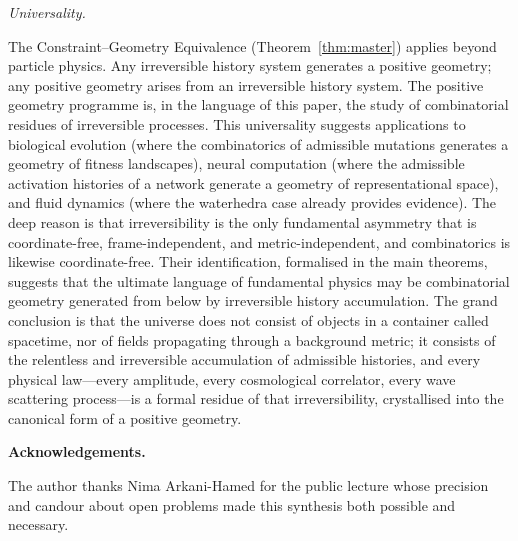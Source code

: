 \documentclass[11pt]{article}
\theoremstyle{plain}
\theoremstyle{definition}
\theoremstyle{remark}
\begin{document}
\medskip\noindent\textit{Universality.}

The Constraint--Geometry Equivalence (Theorem~\ref{thm:master}) applies beyond particle physics. Any irreversible history system generates a positive geometry; any positive geometry arises from an irreversible history system. The positive geometry programme is, in the language of this paper, the study of combinatorial residues of irreversible processes. This universality suggests applications to biological evolution (where the combinatorics of admissible mutations generates a geometry of fitness landscapes), neural computation (where the admissible activation histories of a network generate a geometry of representational space), and fluid dynamics (where the waterhedra case already provides evidence). The deep reason is that irreversibility is the only fundamental asymmetry that is coordinate-free, frame-independent, and metric-independent, and combinatorics is likewise coordinate-free. Their identification, formalised in the main theorems, suggests that the ultimate language of fundamental physics may be combinatorial geometry generated from below by irreversible history accumulation. The grand conclusion is that the universe does not consist of objects in a container called spacetime, nor of fields propagating through a background metric; it consists of the relentless and irreversible accumulation of admissible histories, and every physical law---every amplitude, every cosmological correlator, every wave scattering process---is a formal residue of that irreversibility, crystallised into the canonical form of a positive geometry.

\bigskip\noindent\textbf{Acknowledgements.}

The author thanks Nima Arkani-Hamed for the public lecture whose precision and candour about open problems made this synthesis both possible and necessary.

\newpage


\end{document}
